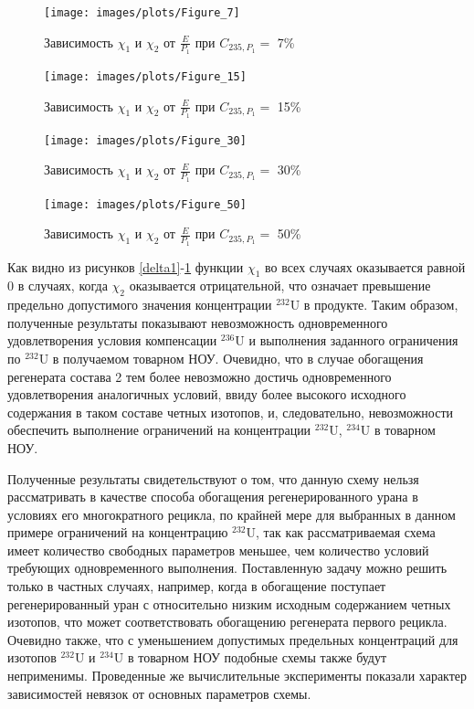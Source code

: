 \begin{figure}[ht]
  \begin{minipage}{.5\textwidth}
    \centering
    \texttt{[image: images/plots/Figure\_7]}  
    \caption{Зависимость $\chi_1$ и $\chi_2$ от $\frac{E}{P_1}$ при $C_{235, P_1}=$ 7\%}
    \label{delta1}
  \end{minipage}
  \begin{minipage}{.5\textwidth}
    \centering
    \texttt{[image: images/plots/Figure\_15]}  
    \caption{Зависимость $\chi_1$ и $\chi_2$ от $\frac{E}{P_1}$ при $C_{235, P_1}=$ 15\%}
    \label{delta2}
  \end{minipage}
  \begin{minipage}{.5\textwidth}
    \centering
    \texttt{[image: images/plots/Figure\_30]}  
    \caption{Зависимость $\chi_1$ и $\chi_2$ от $\frac{E}{P_1}$ при $C_{235, P_1}=$ 30\%}
    \label{delta3}
  \end{minipage}
  \begin{minipage}{.5\textwidth}
    \centering
    \texttt{[image: images/plots/Figure\_50]}  
    \caption{Зависимость $\chi_1$ и $\chi_2$ от $\frac{E}{P_1}$ при $C_{235, P_1}=$ 50\%}
    \label{delta4}
  \end{minipage}
 \end{figure}

Как видно из рисунков \ref{delta1}-\ref{delta4} функции $\chi_1$ во всех случаях оказывается равной 0 в случаях, когда $\chi_2$ оказывается отрицательной, что означает превышение предельно допустимого значения концентрации $^{232}$U в продукте. Таким образом, полученные результаты показывают невозможность одновременного удовлетворения условия компенсации $^{236}$U и выполнения заданного ограничения по $^{232}$U в получаемом товарном НОУ. Очевидно, что в случае обогащения регенерата состава 2 тем более невозможно достичь одновременного удовлетворения аналогичных условий, ввиду более высокого исходного содержания в таком составе четных изотопов, и, следовательно, невозможности обеспечить выполнение ограничений на концентрации $^{232}$U, $^{234}$U в товарном НОУ. 

Полученные результаты свидетельствуют о том, что данную схему нельзя рассматривать в качестве способа обогащения регенерированного урана в условиях его многократного рецикла, по крайней мере для выбранных в данном примере ограничений на концентрацию $^{232}$U, так как рассматриваемая схема имеет количество свободных параметров меньшее, чем количество условий требующих одновременного выполнения. Поставленную задачу можно решить только в частных случаях, например, когда в обогащение поступает регенерированный уран с относительно низким исходным содержанием четных изотопов, что может соответствовать обогащению регенерата первого рецикла. Очевидно также, что с уменьшением допустимых предельных концентраций для изотопов $^{232}$U и $^{234}$U в товарном НОУ подобные схемы также будут неприменимы. Проведенные же вычислительные эксперименты показали характер зависимостей невязок от основных параметров схемы.


